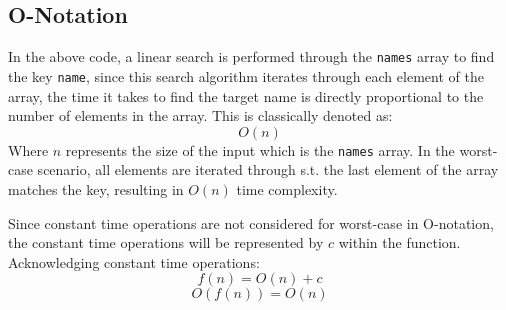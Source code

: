 \documentclass{article}
\begin{document}
\subsection{O-Notation}
In the above code, a linear search is performed through the \verb|names| array to find the key \verb|name|, since this search algorithm iterates through each element of the array, the time it takes to find the target name is directly proportional to the number of elements in the array. This is classically denoted as: $$O(n)$$
Where $n$ represents the size of the input which is the \verb|names| array. In the worst-case scenario, all elements are iterated through s.t. the last element of the array matches the key, resulting in $O(n)$ time complexity.

Since constant time operations are not considered for worst-case in O-notation, the constant time operations will be represented by $c$ within the function. Acknowledging constant time operations:
$$f(n) = O(n) + c$$
$$O(f(n)) = O(n)$$
\\
\\
\\
\\
\end{document}
